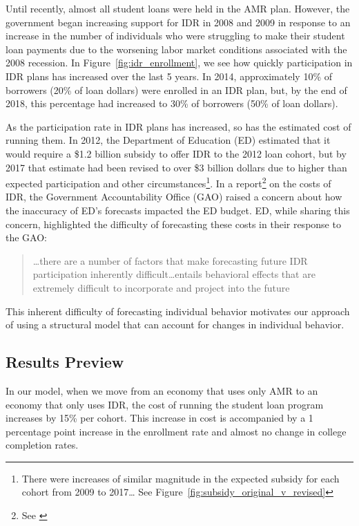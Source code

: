   Until recently, almost all student loans were held in the AMR plan. However, the government began
  increasing support for IDR in 2008 and 2009 in response to an increase in the number of
  individuals who were struggling to make their student loan payments due to the worsening labor
  market conditions associated with the 2008 recession. In Figure~\ref{fig:idr_enrollment}, we see
  how quickly participation in IDR plans has increased over the last 5 years. In 2014, approximately
  10\% of borrowers (20\% of loan dollars) were enrolled in an IDR plan, but, by the end of 2018,
  this percentage had increased to 30\% of borrowers (50\% of loan dollars).

  As the participation rate in IDR plans has increased, so has the estimated cost of running them.
  In 2012, the Department of Education (ED) estimated that it would require a \$1.2 billion subsidy
  to offer IDR to the 2012 loan cohort, but by 2017 that estimate had been revised to over \$3
  billion dollars due to higher than expected participation and other circumstances\footnote{There
  were increases of similar magnitude in the expected subsidy for each cohort from 2009 to 2017\dots
  See Figure~\ref{fig:subsidy_original_v_revised}}. In a report\footnote{See \cite{GAO-17-22}} on
  the costs of IDR, the Government Accountability Office (GAO) raised a concern about how the
  inaccuracy of ED's forecasts impacted the ED budget. ED, while sharing this concern, highlighted
  the difficulty of forecasting these costs in their response to the GAO:

  \begin{quote}
      \dots there are a number of factors that make forecasting future IDR participation inherently
      difficult\dots entails behavioral effects that are extremely difficult to incorporate
      and project into the future
  \end{quote}

  This inherent difficulty of forecasting individual behavior motivates our approach of using a
  structural model that can account for changes in individual behavior.

\subsection{Results Preview}

  In our model, when we move from an economy that uses only AMR to an economy that only uses IDR,
  the cost of running the student loan program increases by 15\% per cohort. This increase in cost
  is accompanied by a 1 percentage point increase in the enrollment rate and almost no change in
  college completion rates.


